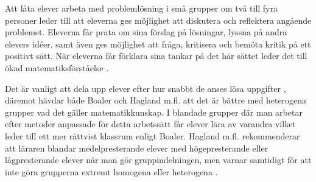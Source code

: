 \textcolor{turkos} {
    Att låta elever arbeta med problemlösning i små grupper om två till fyra personer leder till att eleverna ges möjlighet att diskutera och reflektera angående problemet. Eleverna får prata om sina förslag på lösningar, lyssna på andra elevers idéer, samt även ges möjlighet att fråga, kritisera och bemöta kritik på ett positivt sätt. När eleverna får förklara sina tankar på det här sättet leder det till ökad matematiksförståelse \cite{RikaProblem}.
}




\textcolor{turkos} { Det är vanligt att dela upp elever efter hur snabbt de anses lösa uppgifter \cite{Skolverket03}, däremot hävdar både Boaler \cite{TheElephant} och Hagland m.fl. \cite{RikaProblem} att det är bättre med heterogena grupper vad det gäller matematikkunskap. I blandade grupper där man arbetar efter metoder anpassade för detta arbetssätt får elever lära av varandra vilket leder till ett mer rättvist klassrum enligt Boaler. }
\textcolor{turkos} {
Hagland m.fl. rekommenderar att läraren blandar medelpresterande elever med högepresterande eller lågpresterande elever när man gör gruppindelningen, men varnar samtidigt för att inte göra grupperna extremt homogena eller heterogena \cite{RikaProblem}.
}



